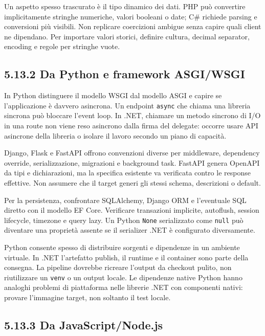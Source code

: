 \documentclass[
  italian,
  10pt,
]{book}
\begin{document}
Un aspetto spesso trascurato è il tipo dinamico dei dati. PHP può
convertire implicitamente stringhe numeriche, valori booleani o date;
C\# richiede parsing e conversioni più visibili. Non replicare
coercizioni ambigue senza capire quali client ne dipendano. Per
importare valori storici, definire cultura, decimal separator, encoding
e regole per stringhe vuote.

\subsection{5.13.2 Da Python e framework
ASGI/WSGI}\label{da-python-e-framework-asgiwsgi}

In Python distinguere il modello WSGI dal modello ASGI e capire se
l'applicazione è davvero asincrona. Un endpoint \texttt{async} che
chiama una libreria sincrona può bloccare l'event loop. In .NET,
chiamare un metodo sincrono di I/O in una route non viene reso asincrono
dalla firma del delegate: occorre usare API asincrone della libreria o
isolare il lavoro secondo un piano di capacità.

Django, Flask e FastAPI offrono convenzioni diverse per middleware,
dependency override, serializzazione, migrazioni e background task.
FastAPI genera OpenAPI da tipi e dichiarazioni, ma la specifica
esistente va verificata contro le response effettive. Non assumere che
il target generi gli stessi schema, descrizioni o default.

Per la persistenza, confrontare SQLAlchemy, Django ORM e l'eventuale SQL
diretto con il modello EF Core. Verificare transazioni implicite,
autoflush, session lifecycle, timezone e query lazy. Un Python
\texttt{None} serializzato come \texttt{null} può diventare una
proprietà assente se il serializer .NET è configurato diversamente.

Python consente spesso di distribuire sorgenti e dipendenze in un
ambiente virtuale. In .NET l'artefatto publish, il runtime e il
container sono parte della consegna. La pipeline dovrebbe ricreare
l'output da checkout pulito, non riutilizzare un \texttt{venv} o un
output locale. Le dipendenze native Python hanno analoghi problemi di
piattaforma nelle librerie .NET con componenti nativi: provare
l'immagine target, non soltanto il test locale.

\subsection{5.13.3 Da JavaScript/Node.js}\label{da-javascriptnode.js}
\end{document}
